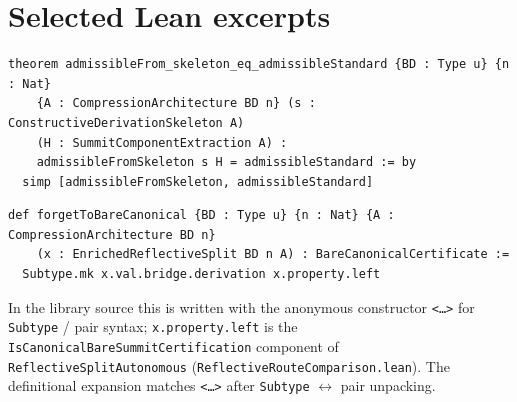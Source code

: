\documentclass[11pt]{article}
\begin{document}
\section{Selected Lean excerpts}\label{app:lean-snippets}

\begin{lstlisting}[language=lean]
theorem admissibleFrom_skeleton_eq_admissibleStandard {BD : Type u} {n : Nat}
    {A : CompressionArchitecture BD n} (s : ConstructiveDerivationSkeleton A) 
    (H : SummitComponentExtraction A) :
    admissibleFromSkeleton s H = admissibleStandard := by
  simp [admissibleFromSkeleton, admissibleStandard]
\end{lstlisting}

\begin{lstlisting}[language=lean]
def forgetToBareCanonical {BD : Type u} {n : Nat} {A : CompressionArchitecture BD n}
    (x : EnrichedReflectiveSplit BD n A) : BareCanonicalCertificate :=
  Subtype.mk x.val.bridge.derivation x.property.left
\end{lstlisting}
\noindent In the library source this is written with the anonymous constructor \texttt{<\dots>} for \texttt{Subtype} / pair syntax; \texttt{x.property.left} is the \texttt{IsCanonicalBareSummitCertification} component of \texttt{ReflectiveSplitAutonomous} (\texttt{ReflectiveRouteComparison.lean}). The definitional expansion matches \texttt{<\dots>} after \texttt{Subtype} $\leftrightarrow$ pair unpacking.
\end{document}
